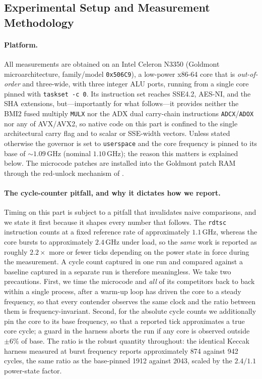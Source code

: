 \subsection{Experimental Setup and Measurement Methodology}
\label{sec:results-setup}

\paragraph{Platform.}
All measurements are obtained on an Intel Celeron N3350 (Goldmont
microarchitecture, family/model \texttt{0x506C9}), a low-power x86-64 core that is
\emph{out-of-order} and three-wide, with three integer ALU ports, running from a
single core pinned with \texttt{taskset\,-c\,0}. Its instruction set reaches
SSE4.2, AES-NI, and the SHA extensions, but---importantly for what follows---it
provides neither the BMI2 fused multiply \texttt{MULX} nor the ADX dual
carry-chain instructions \texttt{ADCX}/\texttt{ADOX} nor any of AVX/AVX2, so
native code on this part is confined to the single architectural carry flag and to
scalar or SSE-width vectors. Unless stated otherwise the governor is set to
\texttt{userspace} and the core frequency is pinned to its base of
$\sim\!1.09$\,GHz (nominal $1.10$\,GHz); the reason this matters is explained
below. The microcode patches are installed into the Goldmont patch RAM through the
red-unlock mechanism of .

\paragraph{The cycle-counter pitfall, and why it dictates how we report.}
Timing on this part is subject to a pitfall that invalidates naive comparisons,
and we state it first because it shapes every number that follows. The
\texttt{rdtsc} instruction counts at a fixed reference rate of approximately
$1.1$\,GHz, whereas the core bursts to approximately $2.4$\,GHz under load, so the
\emph{same} work is reported as roughly $2.2\times$ more or fewer ticks depending
on the power state in force during the measurement. A cycle count captured in one
run and compared against a baseline captured in a separate run is therefore
meaningless. We take two precautions. First, we time the microcode and \emph{all}
of its competitors back to back within a single process, after a warm-up loop has
driven the core to a steady frequency, so that every contender observes the same
clock and the ratio between them is frequency-invariant. Second, for the absolute
cycle counts we additionally pin the core to its base frequency, so that a
reported tick approximates a true core cycle; a guard in the harness aborts the
run if any core is observed outside $\pm 6\%$ of base. The ratio is the robust
quantity throughout: the identical Keccak harness measured at burst frequency
reports approximately 874 against 942 cycles, the same ratio as the base-pinned
1912 against 2043, scaled by the $2.4/1.1$ power-state factor.

